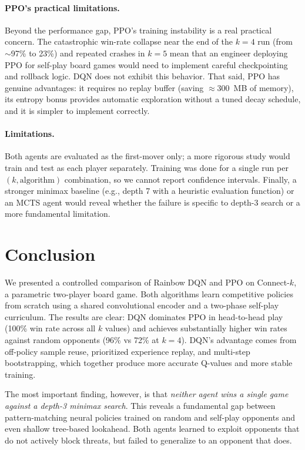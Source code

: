 \documentclass[10pt, letterpaper, twocolumn]{article}
\begin{document}
\paragraph{PPO's practical limitations.}
Beyond the performance gap, PPO's training instability is a real
practical concern.  The catastrophic win-rate collapse near the end of
the $k{=}4$ run (from $\sim$97\% to 23\%) and repeated crashes in
$k{=}5$ mean that an engineer deploying PPO for self-play board games
would need to implement careful checkpointing and rollback logic.  DQN
does not exhibit this behavior.  That said, PPO has genuine advantages:
it requires no replay buffer (saving $\approx$300~MB of memory), its
entropy bonus provides automatic exploration without a tuned decay
schedule, and it is simpler to implement correctly.

\paragraph{Limitations.}
Both agents are evaluated as the first-mover only; a more rigorous study
would train and test as each player separately.  Training was done for a
single run per $(k, \text{algorithm})$ combination, so we cannot report
confidence intervals.  Finally, a stronger minimax baseline (e.g., depth
7 with a heuristic evaluation function) or an MCTS agent would reveal
whether the failure is specific to depth-3 search or a more fundamental
limitation.

\section{Conclusion}
\label{sec:conclusion}

We presented a controlled comparison of Rainbow DQN and PPO on
Connect-$k$, a parametric two-player board game.  Both algorithms learn
competitive policies from scratch using a shared convolutional encoder
and a two-phase self-play curriculum.  The results are clear: DQN
dominates PPO in head-to-head play (100\% win rate across all $k$
values) and achieves substantially higher win rates against random
opponents (96\% vs 72\% at $k{=}4$).  DQN's advantage comes from
off-policy sample reuse, prioritized experience replay, and multi-step
bootstrapping, which together produce more accurate Q-values and more
stable training.

The most important finding, however, is that \emph{neither agent wins a
single game against a depth-3 minimax search}.  This reveals a
fundamental gap between pattern-matching neural policies trained on
random and self-play opponents and even shallow tree-based lookahead.
Both agents learned to exploit opponents that do not actively block
threats, but failed to generalize to an opponent that does.
\end{document}
